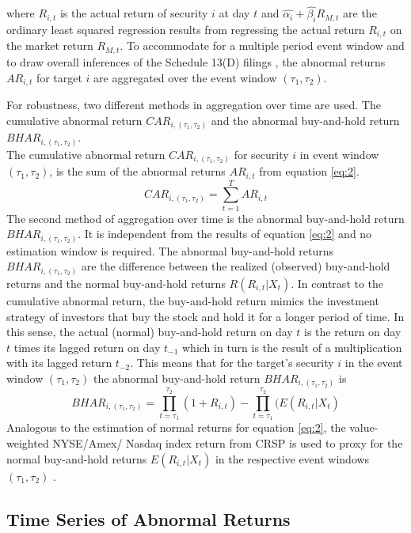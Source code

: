 \documentclass[12pt]{article}
\begin{document}
where $R_{i,t}$ is the actual return of security $i$ at day $t$ and $\hat{\alpha_{i}}+\hat{\beta_{i}}R_{M,t}$ are the ordinary least squared regression results from regressing the actual return $R_{i,t}$ on the market return $R_{M,t}$. To accommodate for a multiple period event window and to draw overall inferences of the Schedule 13(D) filings \citep[p.21]{MacKinlay1997}, the abnormal returns $AR_{i,t}$ for target $i$ are aggregated over the event window $(\tau_1,\tau_2)$.\par
For robustness, two different methods in aggregation over time are used. The cumulative abnormal return $CAR_{i,(\tau_1,\tau_2)}$ and the abnormal buy-and-hold return $BHAR_{i,(\tau_1,\tau_2)}$.\\
The cumulative abnormal return $CAR_{i,(\tau_1,\tau_2)}$ for security $i$ in event window $(\tau_1,\tau_2)$, is the sum of the abnormal returns $AR_{i,t}$ from equation \eqref{eq:2}.
	\begin{equation}
		CAR_{i,(\tau_1,\tau_2)}=\sum_{t=1}^{T}AR_{i,t}
	\end{equation}
The second method of aggregation over time is the abnormal buy-and-hold return $BHAR_{i,(\tau_1,\tau_2)}$. It is independent from the results of equation \eqref{eq:2} and no estimation window is required. 
The abnormal buy-and-hold returns $BHAR_{i,(\tau_1,\tau_2)}$ are the difference between the realized (observed) buy-and-hold returns and the normal buy-and-hold returns $R(R_{i,t}|X_{t})$.
In contrast to the cumulative abnormal return, the buy-and-hold return mimics the investment strategy of investors that buy the stock and hold it for a longer period of time. In this sense, the actual (normal) buy-and-hold return on day $t$ is the return on day $t$ times its lagged return on day $t_{-1}$ which in turn is the result of a multiplication with its lagged return $t_{-2}$. This means that for the target's security $i$ in the event window $(\tau_1,\tau_2)$ the abnormal buy-and-hold return $BHAR_{i,(\tau_1,\tau_2)}$ is
\begin{equation}
	BHAR_{i,(\tau_1,\tau_2)}=\prod_{t=\tau_1}^{\tau_2}(1+R_{i,t})-\prod_{t=\tau_1}^{\tau_2}(E(R_{i,t}|X_{t})
\end{equation}
Analogous to the estimation of normal returns for equation \eqref{eq:2}, the value-weighted NYSE/Amex/ Nasdaq index return from CRSP is used to proxy for the normal buy-and-hold returns $E(R_{i,t}|X_{t})$ in the respective event windows $(\tau_1,\tau_2)$ \citep[p.25]{Brav2009}.

\subsection{Time Series of Abnormal Returns}
\end{document}
